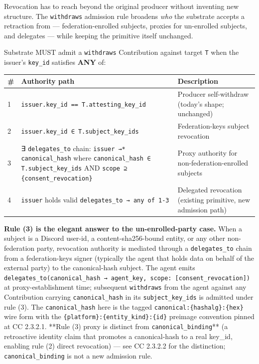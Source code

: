 \documentclass[11pt]{article}
\begin{document}
Revocation has to reach beyond the original producer without inventing new structure. The \texttt{withdraws} admission rule broadens \textit{who} the substrate accepts a retraction from — federation-enrolled subjects, proxies for un-enrolled subjects, and delegates — while keeping the primitive itself unchanged.


Substrate MUST admit a \texttt{withdraws} Contribution against target \texttt{T} when the issuer's \texttt{key\_id} satisfies \textbf{ANY} of:


{\footnotesize
\begin{longtable}{|p{5.33cm}|p{5.33cm}|p{5.33cm}|}\hline
\textbf{\#} & \textbf{Authority path} & \textbf{Description} \\ \hline\endhead
1 & \texttt{issuer.key\_id == T.attesting\_key\_id} & Producer self-withdraw (today's shape; unchanged) \\ \hline
2 & \texttt{issuer.key\_id ∈ T.subject\_key\_ids} & Federation-keys subject revocation \\ \hline
3 & ∃ \texttt{delegates\_to} chain: \texttt{issuer →* canonical\_hash} where \texttt{canonical\_hash ∈ T.subject\_key\_ids} AND \texttt{scope ⊇ \{consent\_revocation\}} & Proxy authority for non-federation-enrolled subjects \\ \hline
4 & \texttt{issuer} holds valid \texttt{delegates\_to → any of 1-3} & Delegated revocation (existing primitive, new admission path) \\ \hline
\end{longtable}}


\textbf{Rule (3) is the elegant answer to the un-enrolled-party case.} When a subject is a Discord user-id, a content-sha256-bound entity, or any other non-federation party, revocation authority is mediated through a \texttt{delegates\_to} chain from a federation-keys signer (typically the agent that holds data on behalf of the external party) to the canonical-hash subject. The agent emits \texttt{delegates\_to(canonical\_hash → agent\_key, scope: [consent\_revocation])} at proxy-establishment time; subsequent \texttt{withdraws} from the agent against any Contribution carrying \texttt{canonical\_hash} in its \texttt{subject\_key\_ids} is admitted under rule (3). The \texttt{canonical\_hash} here is the tagged \texttt{canonical:\{hashalg\}:\{hex\}} wire form with the \texttt{\{platform\}:\{entity\_kind\}:\{id\}} preimage convention pinned at CC 2.3.2.1. **Rule (3) proxy is distinct from \texttt{canonical\_binding}** (a retroactive identity claim that promotes a canonical-hash to a real key\_id, enabling rule (2) direct revocation) — see CC 2.3.2.2 for the distinction; \texttt{canonical\_binding} is not a new admission rule.
\end{document}
